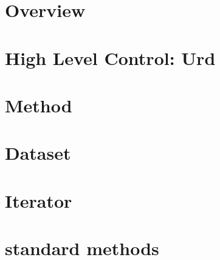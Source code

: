 \documentclass[a4paper]{report}
\begin{document}
\chapter{Overview}


\chapter{High Level Control:  Urd}


\chapter{Method}


\chapter{Dataset}


\chapter{Iterator}


\chapter{standard methods}


%
\end{document}
